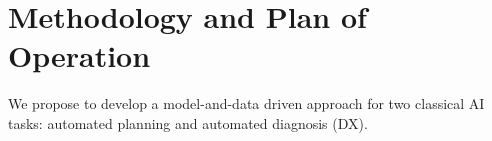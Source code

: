 \documentclass[12pt]{article}
\begin{document}
\section{Methodology and Plan of Operation}
\label{sec:methodology}


We propose to develop a model-and-data driven approach for two classical AI tasks: automated planning and automated diagnosis (DX). %


\end{document}
